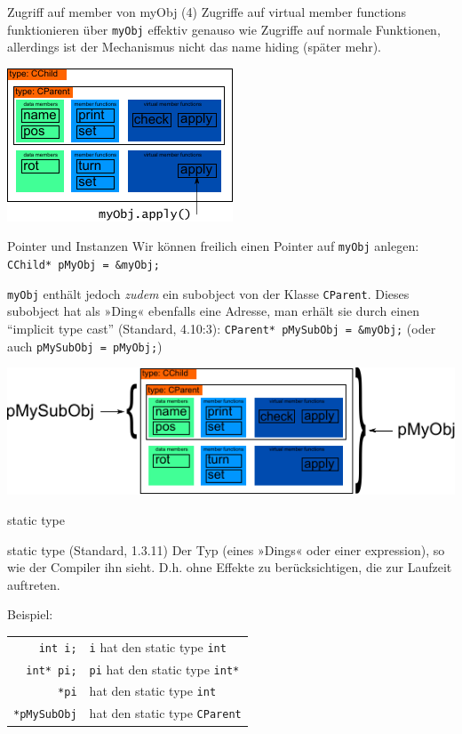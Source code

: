 \begin{frame}[fragile,b]{Zugriff auf member von myObj (4)}
	Zugriffe auf virtual member functions funktionieren über \verb|myObj| effektiv genauso wie Zugriffe auf normale Funktionen, allerdings ist der Mechanismus nicht das name hiding (später mehr).
	
	\vspace{2em}
	
	\includegraphics[width=0.5\linewidth]{images/myObj-apply}
\end{frame}

\begin{frame}[fragile,b]{Pointer und Instanzen}
	Wir können freilich einen Pointer auf \verb|myObj| anlegen: \verb|CChild* pMyObj = &myObj;|
	
	\pause
	\vspace{1em}
	
	\verb|myObj| enthält jedoch \emph{zudem} ein subobject von der Klasse \verb|CParent|. Dieses subobject hat als »Ding« ebenfalls eine Adresse, man erhält sie durch einen \enquote{implicit type cast} (Standard, 4.10:3): \verb|CParent* pMySubObj = &myObj;| (oder auch \verb|pMySubObj = pMyObj;|)
	
	\vspace{2em}
	
	\includegraphics[width=0.75\linewidth]{images/pointers}
\end{frame}

\begin{frame}[fragile]{static type}
	\begin{block}{static type (Standard, 1.3.11)}
		Der Typ (eines »Dings« oder einer expression), so wie der Compiler ihn sieht. D.h. ohne Effekte zu berücksichtigen, die zur Laufzeit auftreten.
	\end{block}
	
	\vspace{2em}
	
	Beispiel:
	\begin{tabular}{r|l}
		\verb|int i;|	&	\verb|i| hat den static type \verb|int|	\\
		\verb|int* pi;|	&	\verb|pi| hat den static type \verb|int*|	\\
		\verb|*pi|	&	hat den static type \verb|int|	\\
		\verb|*pMySubObj|	&	hat den static type \verb|CParent|	\\
	\end{tabular}
\end{frame}

